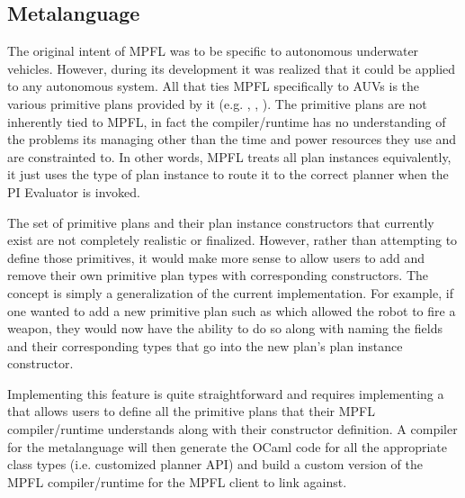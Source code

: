 \subsection{Metalanguage}
The original intent of MPFL was to be specific to autonomous underwater vehicles. However, during its development it was realized that it could be applied to any autonomous system. All that ties MPFL specifically to AUVs is the various primitive plans provided by it (e.g. , , ). The primitive plans are not inherently tied to MPFL, in fact the compiler/runtime has no understanding of the problems its managing other than the time and power resources they use and are constrainted to. In other words, MPFL treats all plan instances equivalently, it just uses the type of plan instance to route it to the correct planner when the PI Evaluator is invoked.

The set of primitive plans and their plan instance constructors that currently exist are not completely realistic or finalized. However, rather than attempting to define those primitives, it would make more sense to allow users to add and remove their own primitive plan types with corresponding constructors. The concept is simply a generalization of the current implementation. For example, if one wanted to add a new primitive plan such as  which allowed the robot to fire a weapon, they would now have the ability to do so along with naming the fields and their corresponding types that go into the new plan's plan instance constructor. 

Implementing this feature is quite straightforward and requires implementing a  that allows users to define all the primitive plans that their MPFL compiler/runtime understands along with their constructor definition. A compiler for the metalanguage will then generate the OCaml code for all the appropriate class types (i.e. customized planner API) and build a custom version of the MPFL compiler/runtime for the MPFL client to link against. 

